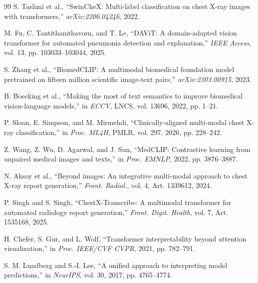 \documentclass[conference]{IEEEtran}
\begin{document}
\begin{thebibliography}{99}
S. Taslimi et al., ``SwinCheX: Multi-label classification on chest X-ray images with transformers,'' \textit{arXiv:2206.04246}, 2022.

M. Fu, C. Tantithamthavorn, and T. Le, ``DAViT: A domain-adapted vision transformer for automated pneumonia detection and explanation,'' \textit{IEEE Access}, vol. 13, pp. 103033--103044, 2025.

S. Zhang et al., ``BiomedCLIP: A multimodal biomedical foundation model pretrained on fifteen million scientific image-text pairs,'' \textit{arXiv:2303.00915}, 2023.

B. Boecking et al., ``Making the most of text semantics to improve biomedical vision-language models,'' in \textit{ECCV}, LNCS, vol. 13696, 2022, pp. 1--21.

P. Sloan, E. Simpson, and M. Mirmehdi, ``Clinically-aligned multi-modal chest X-ray classification,'' in \textit{Proc. ML4H}, PMLR, vol. 297, 2026, pp. 228--242.

Z. Wang, Z. Wu, D. Agarwal, and J. Sun, ``MedCLIP: Contrastive learning from unpaired medical images and texts,'' in \textit{Proc. EMNLP}, 2022, pp. 3876--3887.

N. Aksoy et al., ``Beyond images: An integrative multi-modal approach to chest X-ray report generation,'' \textit{Front. Radiol.}, vol. 4, Art. 1339612, 2024.

P. Singh and S. Singh, ``ChestX-Transcribe: A multimodal transformer for automated radiology report generation,'' \textit{Front. Digit. Health}, vol. 7, Art. 1535168, 2025.

H. Chefer, S. Gur, and L. Wolf, ``Transformer interpretability beyond attention visualization,'' in \textit{Proc. IEEE/CVF CVPR}, 2021, pp. 782--791.

S. M. Lundberg and S.-I. Lee, ``A unified approach to interpreting model predictions,'' in \textit{NeurIPS}, vol. 30, 2017, pp. 4765--4774.

\end{thebibliography}
\end{document}
